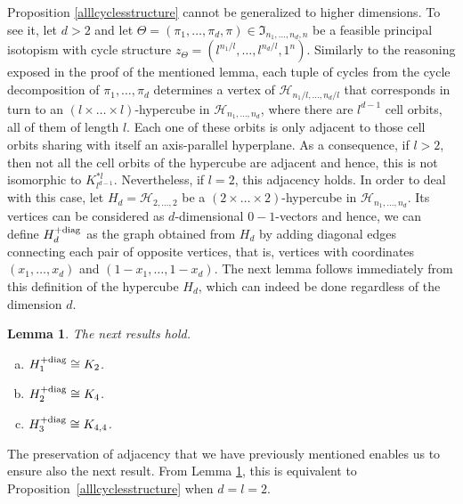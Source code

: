 \documentclass{article}
\newtheorem{lem}[thm]{Lemma}
\begin{document}
Proposition \ref{alllcyclesstructure} cannot be generalized to higher dimensions. To see it, let $d>2$ and let $\Theta=(\pi_1,\ldots,\pi_d,\pi)\in \mathfrak{I}_{n_1,\ldots,n_d,n}$ be 
a feasible principal isotopism with cycle structure $z_{\Theta}=\left(l^{n_1/l},\ldots,l^{n_d/l},1^n\right)$. Similarly to the reasoning exposed in the proof of the mentioned lemma, 
each tuple of cycles from the cycle decomposition of $\pi_1,\ldots, \pi_d$ determines a vertex of $\mathcal{H}_{n_1/l,\ldots,n_d/l}$ that corresponds in turn to an $(l\times 
\ldots\times l)$-hypercube in $\mathcal{H}_{n_1,\ldots,n_d}$, where there are $l^{d-1}$ cell orbits, all of them of length $l$. Each one of these orbits is only adjacent to those cell 
orbits sharing with itself an axis-parallel hyperplane. As a consequence, if $l>2$, then not all the cell orbits of the hypercube are adjacent and hence, this is not isomorphic to 
$K_{l^{d-1}}^{\ast l}$. Nevertheless, if $l=2$, this adjacency holds. In order to deal with this case, let $H_d=\mathcal{H}_{2,\ldots,2}$ be a $(2\times\ldots\times 2)$-hypercube in $\mathcal{H}_{n_1,\ldots,n_d}$. Its vertices can be considered as $d$-dimensional $0-1$-vectors and hence, we can define $H_d^{+{\rm diag}}$ as the graph obtained from $H_d$ by adding diagonal edges connecting each pair of opposite vertices, that is, vertices with coordinates $(x_1,\ldots,x_d)$ and $(1-x_1,\ldots,1-x_d)$. The next lemma follows immediately from this definition of the hypercube $H_d$, which can indeed be done regardless of the dimension $d$.


\begin{lem}\label{lem_Hd} The next results hold.
\begin{enumerate}[a)]
\item $H_1^{+{\rm diag}}\cong K_2$.
\item $H_2^{+{\rm diag}}\cong K_4$.
\item $H_3^{+{\rm diag}}\cong K_{4,4}$.
\end{enumerate}
\end{lem}

The preservation of adjacency that we have previously mentioned enables us to ensure also the next result. From Lemma \ref{lem_Hd}, this is equivalent to Proposition~\ref{alllcyclesstructure} when $d=l=2$.
\end{document}
